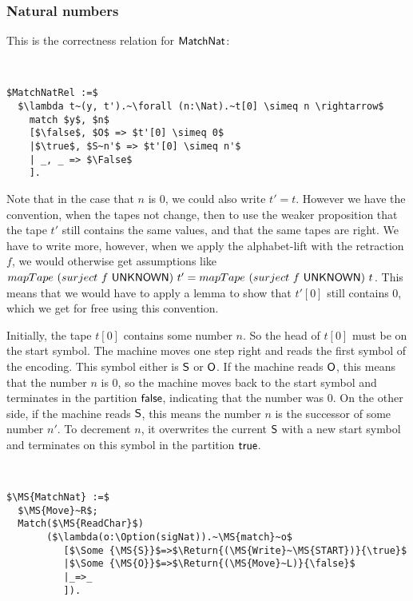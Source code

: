 \subsubsection{Natural numbers}
\label{sec:match-nat}

This is the correctness relation for $\MS{MatchNat}$:
%
\begin{definition}
  \label{def:MatchNat_Rel}
  ~
\begin{lstlisting}[style=semicoqstyle]
$MatchNatRel :=$
  $\lambda t~(y, t').~\forall (n:\Nat).~t[0] \simeq n \rightarrow$
    match $y$, $n$
    [$\false$, $O$ => $t'[0] \simeq 0$
    |$\true$, $S~n'$ => $t'[0] \simeq n'$
    | _, _ => $\False$
    ].
\end{lstlisting}
\end{definition}

Note that in the case that $n$ is $0$, we could also write $t'=t$.  However we have the convention, when the tapes not change, then to use the weaker
proposition that the tape $t'$ still contains the same values, and that the same tapes are right.  We have to write more, however, when we apply the
alphabet-lift with the retraction $f$, we would otherwise get assumptions like
$mapTape~(surject~f~\mathsf{UNKNOWN})~t' = mapTape~(surject~f~\mathsf{UNKNOWN})~t$.  This means that we would have to apply a lemma to show that $t'[0]$ still
contains $0$, which we get for free using this convention.

Initially, the tape $t[0]$ contains some number $n$.  So the head of $t[0]$ must be on the start symbol.  The machine moves one step right and reads
the first symbol of the encoding.  This symbol either is $\mathsf{S}$ or $\mathsf{O}$.  If the machine reads $\mathsf{O}$, this means that the number $n$ is $0$,
so the machine moves back to the start symbol and terminates in the partition $\mathsf{false}$, indicating that the number was $0$.  On the other side, if the
machine reads $\mathsf{S}$, this means the number $n$ is the successor of some number $n'$.  To decrement $n$, it overwrites the current $\mathsf{S}$ with a
new start symbol and terminates on this symbol in the partition $\mathsf{true}$.

\begin{definition}[$\MS{MatchNat}$][MatchNat]
  \label{def:MatchNat}
  ~
\begin{lstlisting}[style=semicoqstyle]
$\MS{MatchNat} :=$
  $\MS{Move}~R$; 
  Match($\MS{ReadChar}$) 
       ($\lambda(o:\Option(sigNat)).~\MS{match}~o$
          [$\Some {\MS{S}}$=>$\Return{(\MS{Write}~\MS{START})}{\true}$
          |$\Some {\MS{O}}$=>$\Return{(\MS{Move}~L)}{\false}$
          |_=>_ 
          ]).
\end{lstlisting}
\end{definition}

